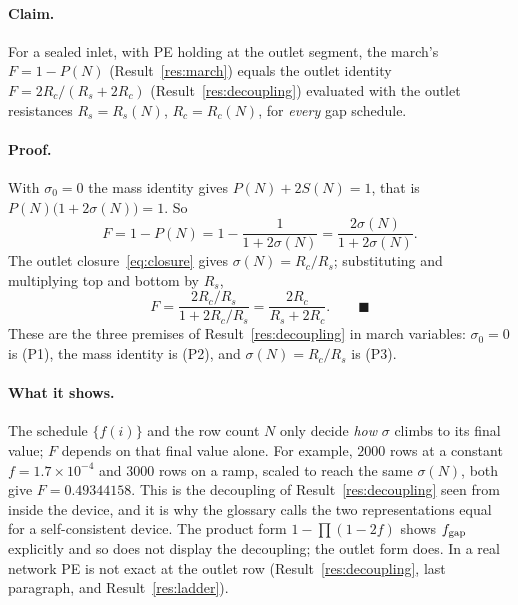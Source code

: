 \paragraph{Claim.} For a sealed inlet, with PE holding at the outlet segment, the march's
$F=1-P(N)$ (Result~\ref{res:march}) equals the outlet identity $F=2R_c/(R_s+2R_c)$
(Result~\ref{res:decoupling}) evaluated with the outlet resistances $R_s=R_s(N)$,
$R_c=R_c(N)$, for \emph{every} gap schedule.

\paragraph{Proof.} With $\sigma_0=0$ the mass identity gives $P(N)+2S(N)=1$, that is
$P(N)\big(1+2\sigma(N)\big)=1$. So
\begin{equation}
F=1-P(N)=1-\frac{1}{1+2\sigma(N)}=\frac{2\sigma(N)}{1+2\sigma(N)} .
\end{equation}
The outlet closure~\eqref{eq:closure} gives $\sigma(N)=R_c/R_s$; substituting and multiplying
top and bottom by $R_s$,
\begin{equation}
F=\frac{2R_c/R_s}{1+2R_c/R_s}=\frac{2R_c}{R_s+2R_c}. \qquad\blacksquare
\end{equation}
These are the three premises of Result~\ref{res:decoupling} in march variables: $\sigma_0=0$ is
(P1), the mass identity is (P2), and $\sigma(N)=R_c/R_s$ is (P3).

\paragraph{What it shows.} The schedule $\{f(i)\}$ and the row count $N$ only decide \emph{how}
$\sigma$ climbs to its final value; $F$ depends on that final value alone. For example, $2000$
rows at a constant $f=1.7\times10^{-4}$ and $3000$ rows on a ramp, scaled to reach the same
$\sigma(N)$, both give $F=0.49344158$. This is the decoupling of Result~\ref{res:decoupling} seen
from inside the device, and it is why the glossary calls the two representations equal for a
self-consistent device. The product form $1-\prod(1-2f)$ shows $f_{\mathrm{gap}}$ explicitly and so does
not display the decoupling; the outlet form does. In a real network PE is not exact at the
outlet row (Result~\ref{res:decoupling}, last paragraph, and Result~\ref{res:ladder}).

\label{res:transport}

